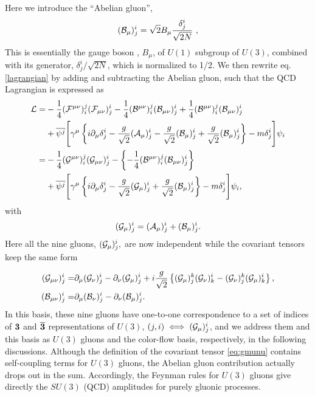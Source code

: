 \documentclass[a4paper,11pt]{article}
\begin{document}
Here we introduce the ``Abelian gluon'',
\begin{align}
 ({\cal B}_{\mu})^i_j=\sqrt{2}B_{\mu}\frac{\delta^i_j}{\sqrt{2N}}\,\,,
\end{align}
This is essentially the gauge boson , $B_{\mu}$, of $U(1)$ subgroup of $U(3)$, combined with its generator, $\delta^i_j/\sqrt{2N}$, which is normalized to 1/2.  We then rewrite
eq.\eqref{lagrangian} by adding and subtracting the Abelian gluon,
such that the QCD Lagrangian is expressed as
\begin{align}
 {\cal L}=&-\frac{1}{4}({\cal F}^{\mu\nu})^j_i({\cal
 F}_{\mu\nu})^i_j
-\frac{1}{4}({\cal B}^{\mu\nu})^j_i({\cal
 B}_{\mu\nu})^i_j
+\frac{1}{4}({\cal B}^{\mu\nu})^j_i({\cal B}_{\mu\nu})^i_j\nonumber\\
&+\overline{\psi^j}\Biggl[\gamma^{\mu}\left\{i\partial_{\mu}\delta^i_j-\frac{g}
{\sqrt{2}}({\cal A}_{\mu})^i_j-\frac{g}{\sqrt{2}}({\cal
  B}_{\mu})^i_j+\frac{g}{\sqrt{2}}({\cal
  B}_{\mu})^i_j\right\}
-m\delta^i_j\Biggr]\psi_i\nonumber\\
=&-\frac{1}{4}({\cal G}^{\mu\nu})^j_i({\cal
 G}_{\mu\nu})^i_j
-\left\{-\frac{1}{4}({\cal B}^{\mu\nu})^j_i({\cal
 B}_{\mu\nu})^i_j\right\}\nonumber\\
&+\overline{\psi^j}\Biggl[\gamma^{\mu}\left\{i\partial_{\mu}\delta^i_j-\frac{g}
{\sqrt{2}}({\cal
  G}_{\mu})^i_j+\frac{g}{\sqrt{2}}({\cal
  B}_{\mu})^i_j\right\}-m\delta^i_j\Biggr]\psi_i
\label{eq:cflag},
\end{align}
with
\begin{align}
({\cal G}_{\mu})^i_j=({\cal A}_{\mu})^i_j+({\cal B}_{\mu})^i_j.
\end{align}
Here all the nine gluons, $({\cal G}_{\mu})^i_j,$ are now independent while the
 covariant tensors keep the same form

\begin{align}
({\cal G}_{\mu\nu})^i_j=&\partial_{\mu}({\cal G}_{\nu})^i_j
-\partial_{\nu}({\cal G}_{\mu})^i_j+i\frac{g}{\sqrt{2}}\left\{({\cal G}_{\mu})^k_j
({\cal G}_{\nu})^i_k-({\cal G}_{\nu})^k_j
({\cal G}_{\mu})^i_k\right\}\label{eq:gmunu},\\
({\cal B}_{\mu\nu})^i_j=&\partial_{\mu}({\cal B}_{\nu})^i_j
-\partial_{\nu}({\cal B}_{\mu})^i_j\label{eq:bmunu}.
\end{align}
 In this basis, these nine gluons have one-to-one correspondence to a set
of indices of ${\bf 3}$
and ${\bf \overline{3}}$ representations of $U(3)$, $(j,i) \iff ({\cal G}_{\mu})^i_j$, and we address them and this basis as $U(3)$ gluons  and the color-flow basis, respectively, in the following discussions. Although the definition of the covariant tensor \eqref{eq:gmunu} contains self-coupling
 terms for $U(3)$ gluons, the Abelian gluon contribution actually drops out
 in the sum. Accordingly, the Feynman rules for $U(3)$ gluons give directly the $SU(3)$ (QCD) amplitudes for purely
 gluonic processes\cite{fabio}. 
\end{document}

